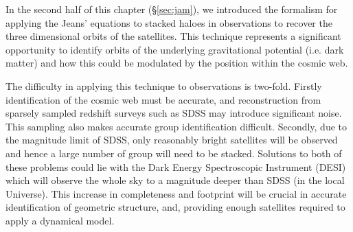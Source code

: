 In the second half of this chapter (\S\ref{sec:jam}), we introduced the formalism for applying the Jeans' equations to stacked haloes in observations to recover the three dimensional orbits of the satellites. This technique represents a significant opportunity to identify orbits of the underlying gravitational potential (i.e. dark matter) and how this could be modulated by the position within the cosmic web. 

The difficulty in applying this technique to observations is two-fold. Firstly identification of the cosmic web must be accurate, and reconstruction from sparsely sampled redshift surveys such as SDSS may introduce significant noise. This sampling also makes accurate group identification difficult. Secondly, due to the magnitude limit of SDSS, only reasonably bright satellites will be observed and hence a large number of group will need to be stacked. Solutions to both of these problems could lie with the Dark Energy Spectroscopic Instrument (DESI) which will observe the whole sky to a magnitude deeper than SDSS (in the local Universe). This increase in completeness and footprint will be crucial in accurate identification of geometric structure, and, providing enough satellites required to apply a dynamical model. 